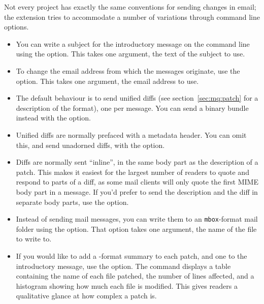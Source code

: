 Not every project has exactly the same conventions for sending changes
in email; the  extension tries to accommodate a
number of variations through command line options.
\begin{itemize}
\item You can write a subject for the introductory message on the
  command line using the  option.  This
  takes one argument, the text of the subject to use.
\item To change the email address from which the messages originate,
  use the  option.  This takes one
  argument, the email address to use.
\item The default behaviour is to send unified diffs (see
  section~\ref{sec:mq:patch} for a description of the format), one per
  message.  You can send a binary bundle instead with the
   option.  
\item Unified diffs are normally prefaced with a metadata header.  You
  can omit this, and send unadorned diffs, with the
   option.
\item Diffs are normally sent ``inline'', in the same body part as the
  description of a patch.  This makes it easiest for the largest
  number of readers to quote and respond to parts of a diff, as some
  mail clients will only quote the first MIME body part in a message.
  If you'd prefer to send the description and the diff in separate
  body parts, use the  option.
\item Instead of sending mail messages, you can write them to an
  \texttt{mbox}-format mail folder using the
   option.  That option takes one
  argument, the name of the file to write to.
\item If you would like to add a -format summary to
  each patch, and one to the introductory message, use the
   option.  The 
  command displays a table containing the name of each file patched,
  the number of lines affected, and a histogram showing how much each
  file is modified.  This gives readers a qualitative glance at how
  complex a patch is.
\end{itemize}

